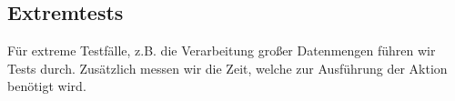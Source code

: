 %



\newpage



\label{Abschnitt:Tests:Protokoll:Extrem}



\subsection*{Extremtests}

Für extreme Testfälle, z.B. die Verarbeitung großer Datenmengen führen wir Tests durch. Zusätzlich messen wir die Zeit, welche zur Ausführung der Aktion benötigt wird.





